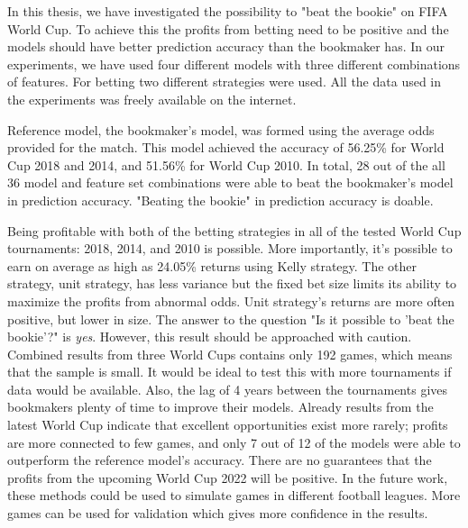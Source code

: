 In this thesis, we have investigated the possibility to "beat the bookie" on FIFA World Cup. To achieve this the profits from betting need to be positive and the models should have better prediction accuracy than the bookmaker has. In our experiments, we have used four different models with three different combinations of features. For betting two different strategies were used. All the data used in the experiments was freely available on the internet.

Reference model, the bookmaker's model, was formed using the average odds provided for the match. This model achieved the accuracy of 56.25\% for World Cup 2018 and 2014, and 51.56\% for World Cup 2010. In total, 28 out of the all 36 model and feature set combinations were able to beat the bookmaker's model in prediction accuracy. "Beating the bookie" in prediction accuracy is doable.

Being profitable with both of the betting strategies in all of the tested World Cup tournaments: 2018, 2014, and 2010 is possible. More importantly, it's possible to earn on average as high as 24.05\% returns using Kelly strategy. The other strategy, unit strategy, has less variance but the fixed bet size limits its ability to maximize the profits from abnormal odds. Unit strategy's returns are more often positive, but lower in size. The answer to the question
"Is it possible to 'beat the bookie'?" is \textit{yes}. However, this result should be approached with caution. Combined results from three World Cups contains only 192 games, which means that the sample is small. It would be ideal to test this with more tournaments if data would be available.
Also, the lag of 4 years between the tournaments gives bookmakers plenty of time to improve their models. Already results from the latest World Cup indicate that excellent opportunities exist more rarely; profits are more connected to few games, and only 7 out of 12 of the models were able to outperform the reference model's accuracy. There are no guarantees that the profits from the upcoming World Cup 2022 will be positive. In the future work, these methods could be used to simulate games in different football leagues. More games can be used for validation which gives more confidence in the results.

